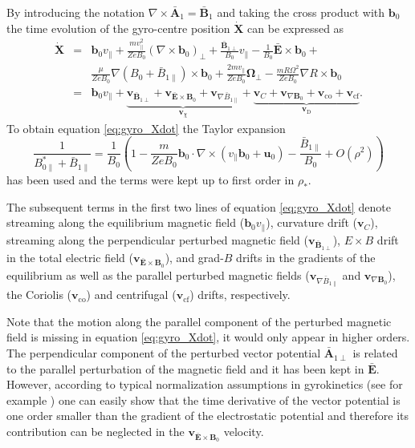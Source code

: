 \documentclass[a4paper,10pt]{article}
\newcommand{\st}[1]{\mathrm{#1}} %
\renewcommand{\vec}[1]{\mathbf{#1}}
\begin{document}
By introducing the notation $\nabla \times \bar{\mathbf{A}}_1 = \bar{\mathbf{B}}_1$ and taking the cross product with $\mathbf{b}_0$ the time evolution of the gyro-centre position $\dot{\mathbf{X}}$ can be expressed as
\begin{eqnarray}
	\dot{\mathbf{X}} &=& \mathbf{b}_0 v_{\parallel} + \frac{m v_{\parallel}^2}{Z e B_0} \left( \nabla \times \mathbf{b}_0 \right)_{\perp} + \frac{\bar{\mathbf{B}}_{1 \perp}}{B_0} v_{\parallel} - \frac{1}{B_0} \bar{\mathbf{E}} \times \mathbf{b}_0 + \nonumber \\
	&& \frac{\mu}{Z e B_0} \nabla \left( B_0 + \bar{B}_{1 \parallel} \right) \times \mathbf{b}_0 + \frac{2 m v_{\parallel}}{Z e B_0} \vec{\Omega}_{\perp} - \frac{m R \Omega^2}{Z e B_0} \nabla R \times \vec{b}_0 \nonumber \\
	&=& \mathbf{b}_0 v_{\parallel} + \underbrace{\mathbf{v}_{\bar{\vec{B}}_{1 \perp}} + \mathbf{v}_{\bar{\vec{E}} \times \vec{B}_0} + \mathbf{v}_{\nabla \bar{B}_{1\parallel}}}_{\vec{v}_{\chi}} + \underbrace{\mathbf{v}_{C} + \mathbf{v}_{\nabla \vec{B}_0} + \vec{v}_{\st{co}} + \vec{v}_{\st{cf}}}_{\mathbf{v}_{\st{D}}}.
	\label{eq:gyro_Xdot}
\end{eqnarray}
To obtain equation \ref{eq:gyro_Xdot} the Taylor expansion
\[\frac{1}{B_{0 \parallel}^{*} + \bar{B}_{1 \parallel}} = \frac{1}{B_0} \left( 1 - \frac{m}{Z e B_0} \mathbf{b}_0 \cdot \nabla \times ( v_{\parallel} \mathbf{b}_0 + \vec{u}_0) - \frac{\bar{B}_{1 \parallel}}{B_0}  + O(\rho^2) \right)\]
has been used and the terms were kept up to first order in $\rho_*$. 

The subsequent terms in the first two lines of equation \ref{eq:gyro_Xdot} denote streaming along the equilibrium magnetic field ($\mathbf{b}_0 v_{\parallel}$), curvature drift ($\mathbf{v}_C$), streaming along the perpendicular perturbed magnetic field ($\mathbf{v}_{\bar{\vec{B}}_{1\perp}}$), $E \times B$ drift in the total electric field ($\mathbf{v}_{\bar{\vec{E}} \times \vec{B}_0}$), and grad-$B$ drifts in the gradients of the equilibrium as well as the parallel perturbed magnetic fields ($\mathbf{v}_{\nabla \bar{B}_{1 \parallel}}$ and $\mathbf{v}_{\nabla \vec{B}_0}$), the Coriolis ($\vec{v}_{\st{co}}$) and centrifugal ($\vec{v}_{\st{cf}}$) drifts, respectively.

Note that the motion along the parallel component of the perturbed magnetic field is missing in equation \ref{eq:gyro_Xdot}, it would only appear in higher orders. The perpendicular component of the perturbed vector potential $\bar{\mathbf{A}}_{1 \perp}$ is related to the parallel perturbation of the magnetic field and it has been kept in $\bar{\mathbf{E}}$. However, according to typical normalization assumptions in gyrokinetics (see for example \cite{gkw}) one can easily show that the time derivative of the vector potential is one order smaller than the gradient of the electrostatic potential and therefore its contribution can be neglected in the $\mathbf{v}_{\bar{\vec{E}} \times \vec{B}_0}$ velocity.
\end{document}
